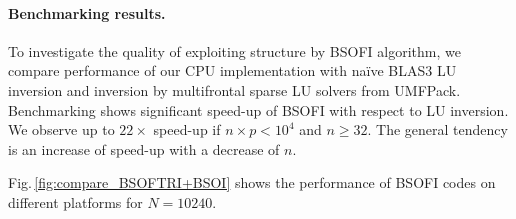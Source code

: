 \documentclass{llncs}
\begin{document}
\paragraph{Benchmarking results.}
\label{sec:benchmarking}

To investigate the quality of exploiting structure by BSOFI algorithm,
we compare performance of our 
CPU implementation with na\"ive BLAS3 LU inversion 
and inversion by multifrontal sparse LU solvers from {\sc UMFPack}. 
Benchmarking shows 
significant speed-up of BSOFI with respect to LU inversion.
We observe up to $22\times$ speed-up if $n\times p < 10^4$ and $n \ge 32$. 
The general tendency is an increase of speed-up with a decrease of $n$.

Fig.\,\ref{fig:compare_BSOFTRI+BSOI} shows the performance of 
BSOFI codes on different platforms for $N=10240$.
\begin{figure}[t]%
  \centering


\end{figure}
\end{document}
